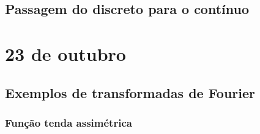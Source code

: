 \documentclass[a4paper,10pt]{book}
\begin{document}
 
 
 
 
 
 
 
 
 
 
 
 
 \section{Passagem do discreto para o contínuo}
 
 \chapter{23 de outubro}
 \section{Exemplos de transformadas de Fourier}
 
 
 
\subsection{Função tenda assimétrica}
\end{document}
